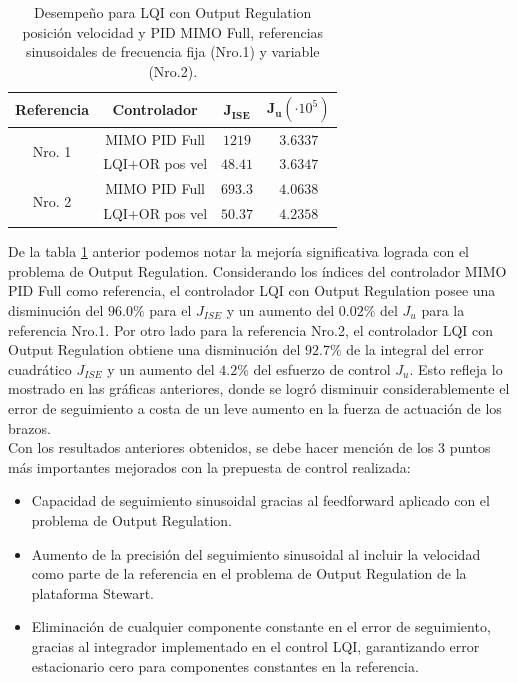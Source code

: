 \begin{table}[H]
\centering
\begin{tabular}{|c|c|c|c|}
\hline
    \textbf{Referencia} & \textbf{Controlador} & $\mathbf{J_{ISE}}$ & $\mathbf{J_{u}}(\cdot10^5)$ \\ \hline
\multicolumn{1}{|c|}{\multirow{2}{*}{Nro. 1}} &  MIMO PID Full & $1219$ & $3.6337$ \\ \cline{2-4}  
\multicolumn{1}{|c|}{}                        & LQI+OR pos vel & $48.41$ & $3.6347$ \\ \hline
\multicolumn{1}{|c|}{\multirow{2}{*}{Nro. 2}} & MIMO PID Full  & $693.3$ & $4.0638$  \\ \cline{2-4} 
\multicolumn{1}{|c|}{}                        & LQI+OR pos vel & $50.37$ & $4.2358$  \\ \hline
\end{tabular}
\caption{Desempeño para LQI con Output Regulation posición velocidad y PID MIMO Full, referencias sinusoidales de frecuencia fija (Nro.1) y variable (Nro.2).}
\label{tab:indices_LQIOR_final}
\end{table}

De la tabla \ref{tab:indices_LQIOR_final} anterior podemos notar la mejoría significativa lograda con el problema de Output Regulation. Considerando los índices del controlador MIMO PID Full como referencia, el controlador LQI con Output Regulation posee una disminución del $96.0\%$ para el $J_{ISE}$ y un aumento del $0.02\%$ del $J_u$ para la referencia Nro.1. Por otro lado para la referencia Nro.2, el controlador LQI con Output Regulation obtiene una disminución del $92.7\%$ de la integral del error cuadrático $J_{ISE}$ y un aumento del $4.2\%$ del esfuerzo de control $J_u$. Esto refleja lo mostrado en las gráficas anteriores, donde se logró disminuir considerablemente el error de seguimiento a costa de un leve aumento en la fuerza de actuación de los brazos.\\

Con los resultados anteriores obtenidos, se debe hacer mención de los 3 puntos más importantes mejorados con la prepuesta de control realizada:
\begin{itemize}
    \item Capacidad de seguimiento sinusoidal gracias al feedforward aplicado con el problema de Output Regulation.
    \item Aumento de la precisión del seguimiento sinusoidal al incluir la velocidad como parte de la referencia en el problema de Output Regulation de la plataforma Stewart.
    \item Eliminación de cualquier componente constante en el error de seguimiento, gracias al integrador implementado en el control LQI, garantizando error estacionario cero para componentes constantes en la referencia.
\end{itemize}